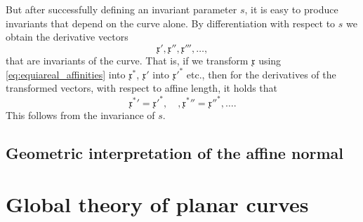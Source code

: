 \documentclass[11pt]{book} \usepackage{amssymb}
\newcommand{\myvec}[1]{\mathfrak{#1}}
\begin{document}
But after successfully defining an invariant parameter $s$, it is easy to
produce invariants that depend on the curve alone. By differentiation with
respect to $s$ we obtain the derivative vectors
\begin{equation}
  \myvec{x}',\myvec{x}'',\myvec{x}''',\ldots,
\end{equation}
that are invariants of the curve. That is, if we transform $\myvec{x}$ using
\eqref{eq:equiareal_affinities} into $\myvec{x}^*$, $\myvec{x}'$ into 
$\myvec{x}'^*$ etc., then for the derivatives 
of the transformed vectors, with respect to affine length, it holds that
\begin{equation}
  {\myvec{x}^*}'=\myvec{x}'^*,\quad , {\myvec{x}^*}''=\myvec{x}''^*,\ldots.
\end{equation}
This follows from the invariance of $s$.

\section{Geometric interpretation of the affine normal}

\chapter{Global theory of planar curves}

 
\end{document}
